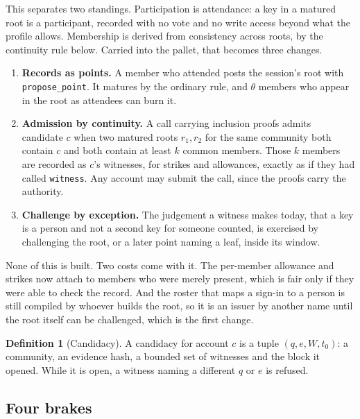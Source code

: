 \documentclass[11pt,a4paper]{article}
\theoremstyle{definition}
\newtheorem{definition}{Definition}[section]
\theoremstyle{plain}
\theoremstyle{remark}
\begin{document}
This separates two standings. Participation is attendance: a key in a matured root is a participant, recorded with no vote and no write access beyond what the profile allows. Membership is derived from consistency across roots, by the continuity rule below. Carried into the pallet, that becomes three changes.

\begin{enumerate}
  \item \textbf{Records as points.} A member who attended posts the session's root with \texttt{propose\_point}. It matures by the ordinary rule, and $\theta$ members who appear in the root as attendees can burn it.
  \item \textbf{Admission by continuity.} A call carrying inclusion proofs admits candidate $c$ when two matured roots $r_1, r_2$ for the same community both contain $c$ and both contain at least $k$ common members. Those $k$ members are recorded as $c$'s witnesses, for strikes and allowances, exactly as if they had called \texttt{witness}. Any account may submit the call, since the proofs carry the authority.
  \item \textbf{Challenge by exception.} The judgement a witness makes today, that a key is a person and not a second key for someone counted, is exercised by challenging the root, or a later point naming a leaf, inside its window.
\end{enumerate}

None of this is built. Two costs come with it. The per-member allowance and strikes now attach to members who were merely present, which is fair only if they were able to check the record. And the roster that maps a sign-in to a person is still compiled by whoever builds the root, so it is an issuer by another name until the root itself can be challenged, which is the first change.

\begin{definition}[Candidacy]
A candidacy for account $c$ is a tuple $(q, e, W, t_0)$: a community, an evidence hash, a bounded set of witnesses and the block it opened. While it is open, a witness naming a different $q$ or $e$ is refused.
\end{definition}

\subsection{Four brakes}
\end{document}
